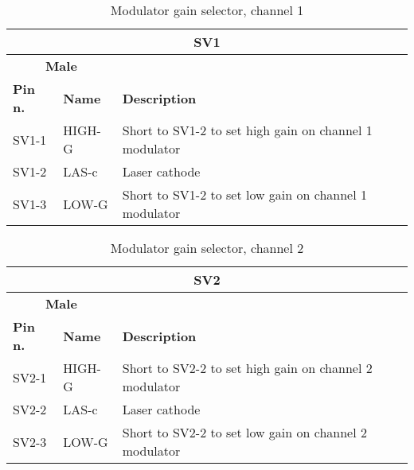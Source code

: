 \begin{table}[H]
    \begin{center}
        \begin{tabular}{
        |p{2cm}
        |>{\centering\arraybackslash}p{2cm}
        |>{\centering\arraybackslash}p{10cm}
        |  }
        \hline
            \multicolumn{3}{|c|}{\textbf{SV1}}  \\
        \hline
        \hline
            \multicolumn{2}{|c|}{\textbf{Male}}  &  61300311121\\
        \hline
        \hline 
            \textbf{Pin n.} & \textbf{Name} & \textbf{Description}\\
        \hline
            SV1-1 & HIGH-G & Short to SV1-2 to set high gain on channel 1 modulator \\
        \hline
            SV1-2 & LAS-c & Laser cathode \\
        \hline
            SV1-3 & LOW-G & Short to SV1-2 to set low gain on channel 1 modulator \\
        \hline
        \end{tabular}
    \caption{Modulator gain selector, channel 1}
    \end{center}
\end{table}

\begin{table}[H]
    \begin{center}
        \begin{tabular}{
        |p{2cm}
        |>{\centering\arraybackslash}p{2cm}
        |>{\centering\arraybackslash}p{10cm}
        |  }
        \hline
            \multicolumn{3}{|c|}{\textbf{SV2}}  \\
        \hline
        \hline
            \multicolumn{2}{|c|}{\textbf{Male}}  &  61300311121\\
        \hline
        \hline 
            \textbf{Pin n.} & \textbf{Name} & \textbf{Description}\\
        \hline
            SV2-1 & HIGH-G & Short to SV2-2 to set high gain on channel 2 modulator \\
        \hline
            SV2-2 & LAS-c & Laser cathode \\
        \hline
            SV2-3 & LOW-G & Short to SV2-2 to set low gain on channel 2 modulator \\
        \hline
        \end{tabular}
    \caption{Modulator gain selector, channel 2}
    \end{center}
\end{table}

